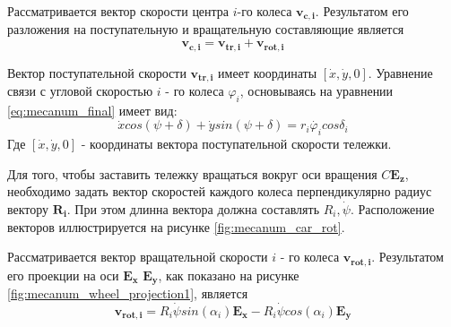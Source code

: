 \documentclass[oneside,final,14pt]{extreport}
\newcommand{\bs}{\boldsymbol}
\begin{document}
\begin{figure}[H]
\end{figure}

Рассматривается вектор скорости центра $i$-го колеса $\bs{v_{c,i}}$. Результатом его разложения на поступательную и вращательную составляющие является
\begin{equation}
\label{eq:mec_wheel_v_decomp}
\bs{v_{c,i}}
=
\bs{v_{tr,i}}
+
\bs{v_{rot,i}}
\end{equation}

Вектор поступательной скорости $\bs{v_{tr,i}}$ имеет координаты $[\dot{x},\dot{y},0]$. Уравнение связи с угловой скоростью $i$ - го колеса $\varphi_{i}$, основываясь на уравнении \ref{eq:mecanum_final} имеет вид:
\begin{equation}
\dot{x}
cos(\psi+\delta)
+
\dot{y}
sin(\psi+\delta)
=
r_{i}\dot{\varphi_{i}}
cos\delta_{i}
\end{equation}
Где $[\dot{x},\dot{y},0]$ - координаты вектора поступательной скорости тележки.

Для того, чтобы заставить тележку вращаться вокруг оси вращения $C\bs{E_{z}}$, необходимо задать вектор скоростей каждого колеса перпендикулярно радиус вектору $\bs{R_{i}}$. При этом длинна вектора должна составлять $R_{i},\dot{\psi}$. Расположение векторов иллюстрируется на  рисунке \ref{fig:mecanum_car_rot}.

\begin{figure}[H]
\end{figure}

Рассматривается вектор вращательной скорости $i$ - го колеса $\bs{v_{rot,i}}$. Результатом его проекции на оси $\bs{E_{x}}$ $\bs{E_{y}}$, как показано на рисунке \ref{fig:mecanum_wheel_projection1}, является
\begin{equation}
\bs{v_{rot,i}}
=
R_{i}
\dot{\psi}
sin(\alpha_{i})
\bs{E_{x}}
-
R_{i}
\dot{\psi}
cos(\alpha_{i})
\bs{E_{y}}
\end{equation}

\begin{figure}[H]
\end{figure}
\end{document}
